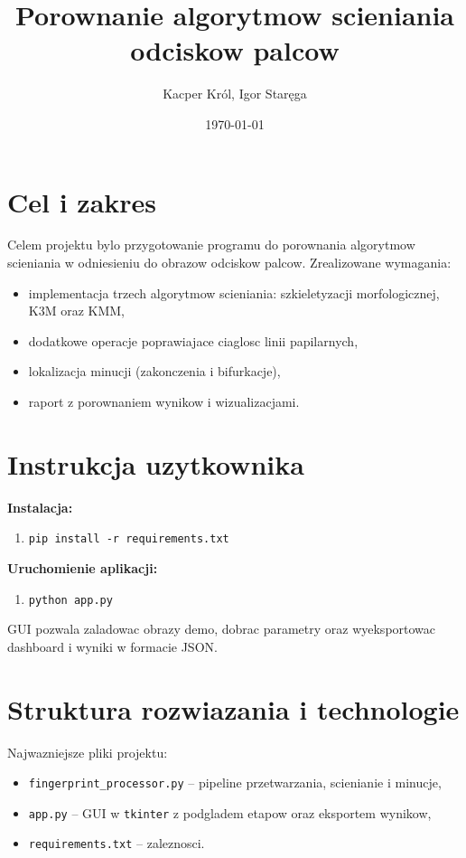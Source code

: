 \documentclass[12pt,a4paper]{article}
\title{Porownanie algorytmow scieniania odciskow palcow}
\author{Kacper Król, Igor Staręga}
\date{\today}
\begin{document}
\maketitle

\newpage
\tableofcontents
\newpage

\section{Cel i zakres}

Celem projektu bylo przygotowanie programu do porownania algorytmow scieniania w odniesieniu do obrazow odciskow palcow. Zrealizowane wymagania:
\begin{itemize}
    \item implementacja trzech algorytmow scieniania: szkieletyzacji morfologicznej, K3M oraz KMM,
    \item dodatkowe operacje poprawiajace ciaglosc linii papilarnych,
    \item lokalizacja minucji (zakonczenia i bifurkacje),
    \item raport z porownaniem wynikow i wizualizacjami.
\end{itemize}

\section{Instrukcja uzytkownika}

\textbf{Instalacja:}
\begin{enumerate}
    \item \texttt{pip install -r requirements.txt}
\end{enumerate}

\textbf{Uruchomienie aplikacji:}
\begin{enumerate}
    \item \texttt{python app.py}
\end{enumerate}

GUI pozwala zaladowac obrazy demo, dobrac parametry oraz wyeksportowac dashboard i wyniki w formacie JSON.

\section{Struktura rozwiazania i technologie}

Najwazniejsze pliki projektu:
\begin{itemize}
    \item \texttt{fingerprint\_processor.py} -- pipeline przetwarzania, scienianie i minucje,
    \item \texttt{app.py} -- GUI w \texttt{tkinter} z podgladem etapow oraz eksportem wynikow,
    \item \texttt{requirements.txt} -- zaleznosci.
\end{itemize}
\end{document}
